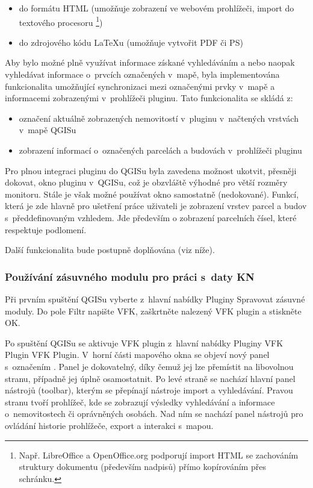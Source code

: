 \documentclass[a4paper,10pt]{article}
\begin{document}
\begin{itemize}
\item do formátu HTML (umožňuje zobrazení ve webovém prohlížeči, import do textového procesoru \footnote{Např. LibreOffice a OpenOffice.org podporují import HTML se zachováním struktury dokumentu (především nadpisů) přímo kopírováním přes schránku.})
\item do zdrojového kódu LaTeXu (umožňuje vytvořit PDF či PS)
\end{itemize}

Aby bylo možné plně využívat informace získané vyhledáváním a nebo naopak vyhledávat informace o~prvcích označených v~mapě, byla implementována funkcionalita umožňující synchronizaci mezi označenými prvky v~mapě a informacemi zobrazenými v~prohlížeči pluginu. Tato funkcionalita se skládá z:
\begin{itemize}
\item označení aktuálně zobrazených nemovitostí v~pluginu v~načtených vrstvách v~mapě QGISu
\item zobrazení informací o~označených parcelách a budovách v~prohlížeči pluginu
\end{itemize}

Pro plnou integraci pluginu do QGISu byla zavedena možnost ukotvit, přesněji dokovat, okno pluginu v~QGISu, což je obzvláště výhodné pro větší rozměry monitoru.
Stále je však možné používat okno samostatně (nedokované).
Funkcí, která je zde hlavně pro ušetření práce uživateli je zobrazení vrstev parcel a budov s~předdefinovaným vzhledem.
Jde především o zobrazení parcelních čísel, které respektuje podlomení.

Další funkcionalita bude postupně doplňována (viz níže).


\subsubsection{Používání zásuvného modulu pro práci s~daty KN}
Při prvním spuštění QGISu vyberte z~hlavní nabídky Pluginy \textrightarrow{} Spravovat zásuvné moduly.
Do pole Filtr napište VFK, zaškrtněte nalezený VFK plugin a stiskněte OK.

Po spuštění QGISu se aktivuje VFK plugin z~hlavní nabídky Pluginy \textrightarrow{} VFK Plugin \textrightarrow{} VFK Plugin.
V~horní části mapového okna se objeví nový panel s~označením .
Panel je dokovatelný, díky čemuž jej lze přemístit na libovolnou stranu, případně jej úplně osamostatnit.
Po levé straně se nachází hlavní panel nástrojů (toolbar), kterým se přepínají nástroje import a vyhledávání.
Pravou stranu tvoří prohlížeč, kde se zobrazují výsledky vyhledávání a informace o~nemovitostech či oprávněných osobách.
Nad ním se nachází panel nástrojů pro ovládání historie prohlížeče, export a interakci s~mapou.
\end{document}
